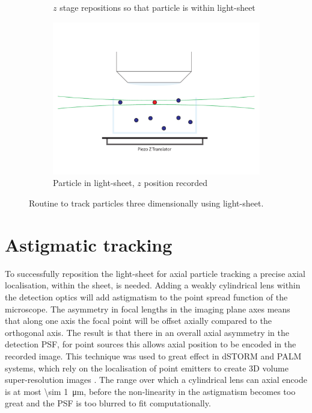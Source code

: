 \begin{figure}
\begin{subfigure}[b]{0.35\linewidth}
		\caption{\(z\) stage repositions so that particle is within light-sheet}
		\label{fig:SPIMSPT3}
	\end{subfigure}
        \hspace{0.05\linewidth}
	\begin{subfigure}[b]{0.35\linewidth}
		\centering
		\includegraphics[width=1\linewidth]{Chapters/spt/Figs/PDF/tracking/4_piezo_track}
		\caption{Particle in light-sheet, \(z\) position recorded}
		\label{fig:SPIMSPT4}
	\end{subfigure}
	\caption{Routine to track particles three dimensionally using light-sheet.}
	\label{fig:SPIMSPT}
\end{figure}

\section{Astigmatic tracking}

To successfully reposition the light-sheet for axial particle tracking a %
precise axial localisation, within the sheet, is needed.
Adding a weakly cylindrical lens within the detection optics will add astigmatism to the point spread function of the microscope.
The asymmetry in focal lengths in the imaging plane axes %
means that along one axis the focal point will be offset axially compared to the orthogonal axis.
The result is that there in an overall axial asymmetry in the detection PSF, for point sources this allows axial position to be encoded in the recorded image.
This technique was used to great effect in dSTORM and PALM systems, which rely on the localisation of point emitters to create 3D volume super-resolution images \cite{}.
The range over which a cylindrical lens can axial encode is at most \SI{\sim 1}{\micro\metre}, before the non-linearity in the astigmatism becomes too great and the PSF is too blurred to fit computationally.

